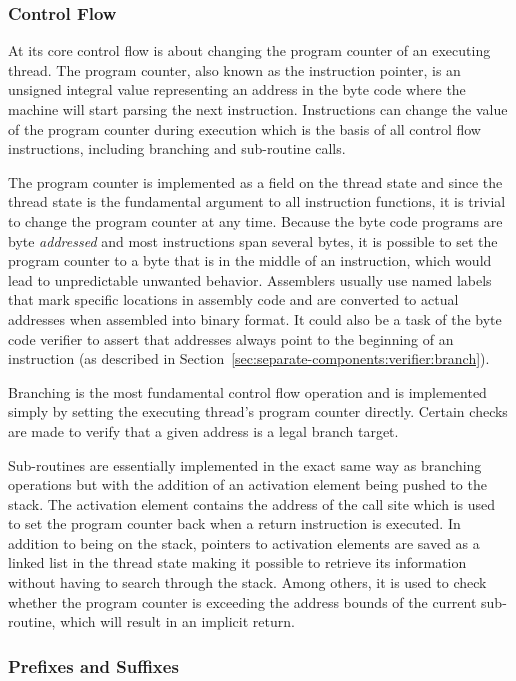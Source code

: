 \subsubsection{Control Flow}
\label{sec:implementation:instr:control-flow}

At its core control flow is about changing the program counter of an executing
thread. The program counter, also known as the instruction pointer, is an
unsigned integral value representing an address in the byte code where the
machine will start parsing the next instruction. Instructions can change the
value of the program counter during execution which is the basis of all control
flow instructions, including branching and sub-routine calls.

The program counter is implemented as a field on the thread state and since the
thread state is the fundamental argument to all instruction functions, it is
trivial to change the program counter at any time. Because the byte code
programs are byte \textit{addressed} and most instructions span several bytes,
it is possible to set the program counter to a byte that is in the middle of an
instruction, which would lead to unpredictable unwanted behavior. Assemblers
usually use named labels that mark specific locations in assembly code and are
converted to actual addresses when assembled into binary format. It could also
be a task of the byte code verifier to assert that addresses always point to the
beginning of an instruction (as described in
Section~\ref{sec:separate-components:verifier:branch}).

Branching is the most fundamental control flow operation and is implemented
simply by setting the executing thread's program counter directly. Certain
checks are made to verify that a given address is a legal branch target.

Sub-routines are essentially implemented in the exact same way as branching
operations but with the addition of an activation element being pushed to the
stack. The activation element contains the address of the call site which is
used to set the program counter back when a return instruction is executed. In
addition to being on the stack, pointers to activation elements are saved as a
linked list in the thread state making it possible to retrieve its information
without having to search through the stack. Among others, it is used to check
whether the program counter is exceeding the address bounds of the current
sub-routine, which will result in an implicit return.

\subsubsection{Prefixes and Suffixes}

